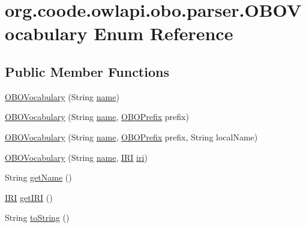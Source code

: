 \hypertarget{enumorg_1_1coode_1_1owlapi_1_1obo_1_1parser_1_1_o_b_o_vocabulary}{\section{org.\-coode.\-owlapi.\-obo.\-parser.\-O\-B\-O\-Vocabulary Enum Reference}
\label{enumorg_1_1coode_1_1owlapi_1_1obo_1_1parser_1_1_o_b_o_vocabulary}
}
\subsection*{Public Member Functions}
\begin{DoxyCompactItemize}
\item 
\hyperlink{enumorg_1_1coode_1_1owlapi_1_1obo_1_1parser_1_1_o_b_o_vocabulary_ad51306ee9b5cbcedb408e2b47ffd1bfd}{O\-B\-O\-Vocabulary} (String \hyperlink{enumorg_1_1coode_1_1owlapi_1_1obo_1_1parser_1_1_o_b_o_vocabulary_aa517e398dd695da1c02e9f0adf61e4b3}{name})
\item 
\hyperlink{enumorg_1_1coode_1_1owlapi_1_1obo_1_1parser_1_1_o_b_o_vocabulary_ab2e8e6408dced0c8ef1bed9b5ae4e52c}{O\-B\-O\-Vocabulary} (String \hyperlink{enumorg_1_1coode_1_1owlapi_1_1obo_1_1parser_1_1_o_b_o_vocabulary_aa517e398dd695da1c02e9f0adf61e4b3}{name}, \hyperlink{enumorg_1_1coode_1_1owlapi_1_1obo_1_1parser_1_1_o_b_o_prefix}{O\-B\-O\-Prefix} prefix)
\item 
\hyperlink{enumorg_1_1coode_1_1owlapi_1_1obo_1_1parser_1_1_o_b_o_vocabulary_a62464047e8e7b33a86849045604607de}{O\-B\-O\-Vocabulary} (String \hyperlink{enumorg_1_1coode_1_1owlapi_1_1obo_1_1parser_1_1_o_b_o_vocabulary_aa517e398dd695da1c02e9f0adf61e4b3}{name}, \hyperlink{enumorg_1_1coode_1_1owlapi_1_1obo_1_1parser_1_1_o_b_o_prefix}{O\-B\-O\-Prefix} prefix, String local\-Name)
\item 
\hyperlink{enumorg_1_1coode_1_1owlapi_1_1obo_1_1parser_1_1_o_b_o_vocabulary_ad246ab7d3335202c571c57ba8d053913}{O\-B\-O\-Vocabulary} (String \hyperlink{enumorg_1_1coode_1_1owlapi_1_1obo_1_1parser_1_1_o_b_o_vocabulary_aa517e398dd695da1c02e9f0adf61e4b3}{name}, \hyperlink{classorg_1_1semanticweb_1_1owlapi_1_1model_1_1_i_r_i}{I\-R\-I} \hyperlink{enumorg_1_1coode_1_1owlapi_1_1obo_1_1parser_1_1_o_b_o_vocabulary_ac855b560d6023d8821e99bfba2adfc6f}{iri})
\item 
String \hyperlink{enumorg_1_1coode_1_1owlapi_1_1obo_1_1parser_1_1_o_b_o_vocabulary_afee6e36e0bcb8935f99f9bff3d060512}{get\-Name} ()
\item 
\hyperlink{classorg_1_1semanticweb_1_1owlapi_1_1model_1_1_i_r_i}{I\-R\-I} \hyperlink{enumorg_1_1coode_1_1owlapi_1_1obo_1_1parser_1_1_o_b_o_vocabulary_afa6a5ca7df48a06deac2befa235f7aea}{get\-I\-R\-I} ()
\item 
String \hyperlink{enumorg_1_1coode_1_1owlapi_1_1obo_1_1parser_1_1_o_b_o_vocabulary_a05c9babc0e355e8acf3dce7a86c27f26}{to\-String} ()
\end{DoxyCompactItemize}
